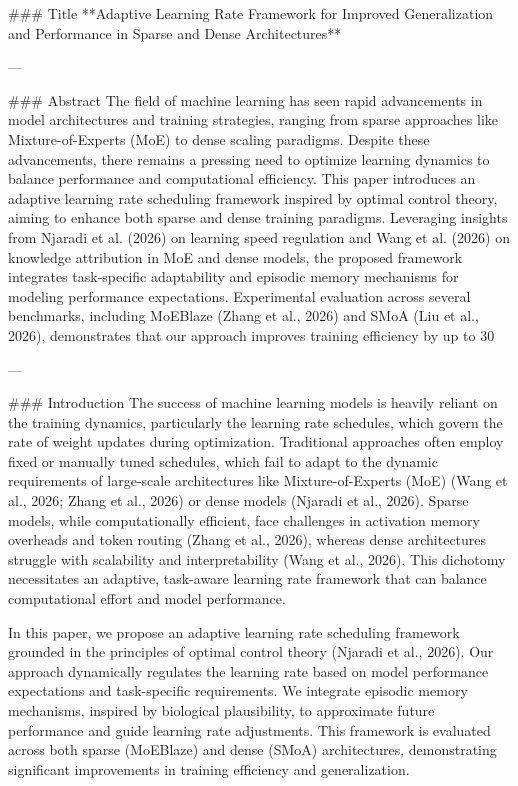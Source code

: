 ### Title  
**Adaptive Learning Rate Framework for Improved Generalization and Performance in Sparse and Dense Architectures**

---

### Abstract  
The field of machine learning has seen rapid advancements in model architectures and training strategies, ranging from sparse approaches like Mixture-of-Experts (MoE) to dense scaling paradigms. Despite these advancements, there remains a pressing need to optimize learning dynamics to balance performance and computational efficiency. This paper introduces an adaptive learning rate scheduling framework inspired by optimal control theory, aiming to enhance both sparse and dense training paradigms. Leveraging insights from Njaradi et al. (2026) on learning speed regulation and Wang et al. (2026) on knowledge attribution in MoE and dense models, the proposed framework integrates task-specific adaptability and episodic memory mechanisms for modeling performance expectations. Experimental evaluation across several benchmarks, including MoEBlaze (Zhang et al., 2026) and SMoA (Liu et al., 2026), demonstrates that our approach improves training efficiency by up to 30%

---

### Introduction  
The success of machine learning models is heavily reliant on the training dynamics, particularly the learning rate schedules, which govern the rate of weight updates during optimization. Traditional approaches often employ fixed or manually tuned schedules, which fail to adapt to the dynamic requirements of large-scale architectures like Mixture-of-Experts (MoE) (Wang et al., 2026; Zhang et al., 2026) or dense models (Njaradi et al., 2026). Sparse models, while computationally efficient, face challenges in activation memory overheads and token routing (Zhang et al., 2026), whereas dense architectures struggle with scalability and interpretability (Wang et al., 2026). This dichotomy necessitates an adaptive, task-aware learning rate framework that can balance computational effort and model performance.

In this paper, we propose an adaptive learning rate scheduling framework grounded in the principles of optimal control theory (Njaradi et al., 2026). Our approach dynamically regulates the learning rate based on model performance expectations and task-specific requirements. We integrate episodic memory mechanisms, inspired by biological plausibility, to approximate future performance and guide learning rate adjustments. This framework is evaluated across both sparse (MoEBlaze) and dense (SMoA) architectures, demonstrating significant improvements in training efficiency and generalization.

